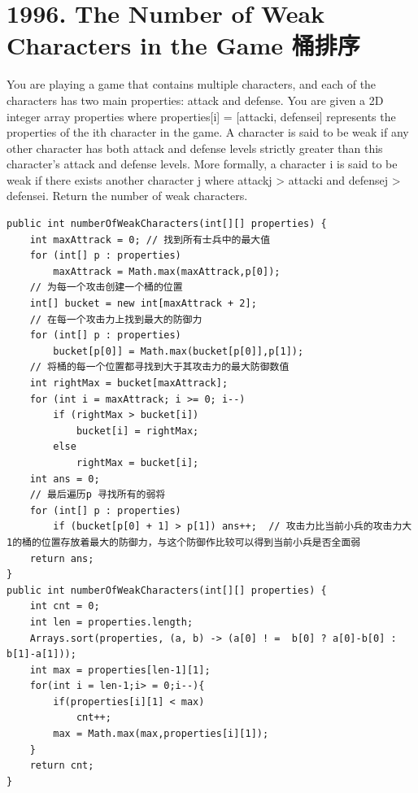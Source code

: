 \documentclass[9pt, b5paaper]{book}
\begin{document}
\section{1996. The Number of Weak Characters in the Game 桶排序}
\label{sec-14-1}
You are playing a game that contains multiple characters, and each of the characters has two main properties: attack and defense. You are given a 2D integer array properties where properties[i] = [attacki, defensei] represents the properties of the ith character in the game.
A character is said to be weak if any other character has both attack and defense levels strictly greater than this character's attack and defense levels. More formally, a character i is said to be weak if there exists another character j where attackj > attacki and defensej > defensei.
Return the number of weak characters.
\begin{verbatim}
public int numberOfWeakCharacters(int[][] properties) {
    int maxAttrack = 0; // 找到所有士兵中的最大值
    for (int[] p : properties)
        maxAttrack = Math.max(maxAttrack,p[0]);
    // 为每一个攻击创建一个桶的位置
    int[] bucket = new int[maxAttrack + 2];     
    // 在每一个攻击力上找到最大的防御力
    for (int[] p : properties)
        bucket[p[0]] = Math.max(bucket[p[0]],p[1]);
    // 将桶的每一个位置都寻找到大于其攻击力的最大防御数值
    int rightMax = bucket[maxAttrack];
    for (int i = maxAttrack; i >= 0; i--) 
        if (rightMax > bucket[i])
            bucket[i] = rightMax;
        else
            rightMax = bucket[i];
    int ans = 0;
    // 最后遍历p 寻找所有的弱将
    for (int[] p : properties)
        if (bucket[p[0] + 1] > p[1]) ans++;  // 攻击力比当前小兵的攻击力大1的桶的位置存放着最大的防御力，与这个防御作比较可以得到当前小兵是否全面弱
    return ans;
}
public int numberOfWeakCharacters(int[][] properties) {
    int cnt = 0;
    int len = properties.length;
    Arrays.sort(properties, (a, b) -> (a[0] ! =  b[0] ? a[0]-b[0] : b[1]-a[1]));
    int max = properties[len-1][1];
    for(int i = len-1;i> = 0;i--){
        if(properties[i][1] < max)
            cnt++;
        max = Math.max(max,properties[i][1]);
    }
    return cnt;
}
\end{verbatim}
\end{document}
